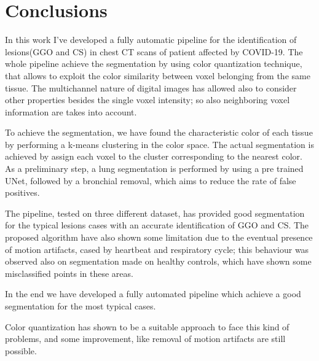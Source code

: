 \documentclass{standalone}
\begin{document}
\chapter*{Conclusions}

In this work I've developed a fully automatic pipeline for the identification of lesions(GGO and CS) in chest CT scans of patient affected by COVID-19.
The whole pipeline achieve the segmentation by using color quantization technique, that allows to exploit the color similarity between voxel belonging from the same tissue.  The multichannel nature of digital images has allowed also to consider other properties besides the single voxel intensity; so also neighboring voxel information are takes into account.

To achieve the segmentation, we have found the characteristic color of each tissue by performing a k-means clustering in the color space.  The actual segmentation is achieved by assign each voxel to the cluster corresponding to the nearest color.
As a preliminary step, a lung segmentation is performed by using a pre trained UNet, followed by a bronchial removal, which aims to reduce the rate of false positives. 

The pipeline, tested on three different dataset, has provided good segmentation for the typical lesions cases with an accurate identification of GGO and CS. The proposed algorithm have also shown some limitation due to the eventual presence of motion artifacts, cased by heartbeat and respiratory cycle; this behaviour was observed also on segmentation made on healthy controls, which have shown some misclassified points in these areas.

In the end we have developed a fully automated pipeline which achieve a good segmentation for the most typical cases. 

Color quantization has shown to be a suitable approach to face this kind of problems, and some improvement, like removal of motion artifacts are still possible.
\end{document}
